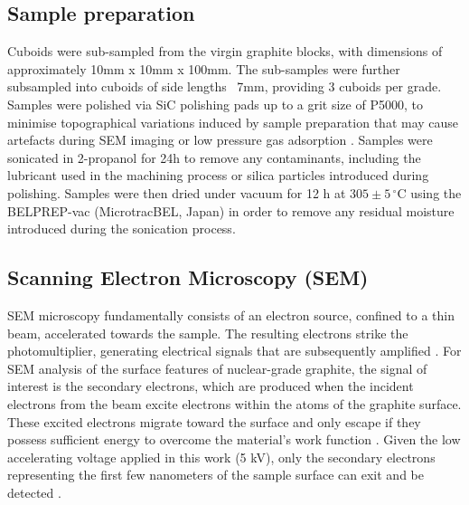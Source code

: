 \documentclass[3p,twocolumn]{elsarticle}
\begin{document}
\subsection{Sample preparation}
Cuboids were sub-sampled from the virgin graphite blocks, with dimensions of
approximately 10mm x 10mm x 100mm. The sub-samples were further subsampled into
cuboids of side lengths ~7mm, providing 3 cuboids per grade. Samples were
polished via SiC polishing pads up to a grit size of P5000, to minimise
topographical variations induced by sample preparation that may cause artefacts
during SEM imaging or low pressure gas adsorption \citep{Fang2022,Jones2018}.
Samples were sonicated in 2-propanol for 24h to remove any contaminants,
including the lubricant used in the machining process or silica particles
introduced during polishing. Samples were then dried under vacuum for 12 h at
$305 \pm 5\,^\circ\mathrm{C}$ using the BELPREP-vac (MicrotracBEL, Japan) in
order to remove any residual moisture introduced during the sonication process.



\subsection{Scanning Electron Microscopy (SEM)}

SEM microscopy fundamentally consists of an electron source, confined to a thin
beam, accelerated towards the sample. The resulting electrons strike the
photomultiplier, generating electrical signals that are subsequently amplified
\cite{Achaw12, Goldstein2003}. For SEM analysis of the surface features of
nuclear-grade graphite, the signal of interest is the secondary electrons, which
are produced when the incident electrons from the beam excite electrons within
the atoms of the graphite surface. These excited electrons migrate toward the
surface and only escape if they possess sufficient energy to overcome the
material's work function \cite{Achaw12, Goldstein2003}. Given the low
accelerating voltage applied in this work (5 kV), only the secondary electrons
representing the first few nanometers of the sample surface can exit and be
detected \cite{Achaw12, Goldstein2003}.
\end{document}
